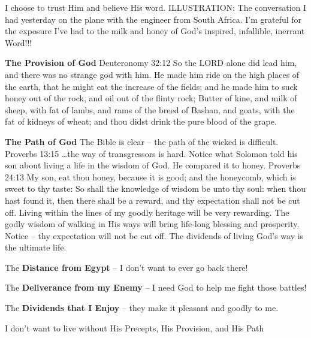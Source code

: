 \begin{compactenum}[I.][8]
\begin{compactenum}[A.][8]
I choose to trust Him and believe His word.
ILLUSTRATION: The conversation I had yesterday on the plane with the engineer from South Africa.
I’m grateful for the exposure I’ve had to the milk and honey of God’s inspired, infallible, inerrant Word!!!
        \item \textbf{The Provision of God}
Deuteronomy 32:12 So the LORD alone did lead him, and there was no strange god with him.  He made him ride on the high places of the earth, that he might eat the increase of the fields; and he made him to suck honey out of the rock, and oil out of the flinty rock;  Butter of kine, and milk of sheep, with fat of lambs, and rams of the breed of Bashan, and goats, with the fat of kidneys of wheat; and thou didst drink the pure blood of the grape.
        \item \textbf{The Path of God}
The Bible is clear – the path of the wicked is difficult.
Proverbs 13:15   …the way of transgressors is hard.
Notice what Solomon told his son about living a life in the wisdom of God. He compared it to honey.
Proverbs 24:13 My son, eat thou honey, because it is good; and the honeycomb, which is sweet to thy taste:  So shall the knowledge of wisdom be unto thy soul: when thou hast found it, then there shall be a reward, and thy expectation shall not be cut off.
Living within the lines of my goodly heritage will be very rewarding.
The godly wisdom of walking in His ways will bring life-long blessing and prosperity.
Notice – thy expectation will not be cut off.
The dividends of living God’s way is the ultimate life.\\
    \end{compactenum}
\end{compactenum}

\begin{compactenum}[I.][8]
    \item The \textbf{Distance from Egypt} – I don’t want to ever go back there!
    \item The \textbf{Deliverance from my Enemy} – I need God to help me fight those battles!
    \item The \textbf{Dividends that I Enjoy} – they make it pleasant and goodly to me.\\
\end{compactenum}

\noindent I don’t want to live without His Precepts, His Provision, and His Path

